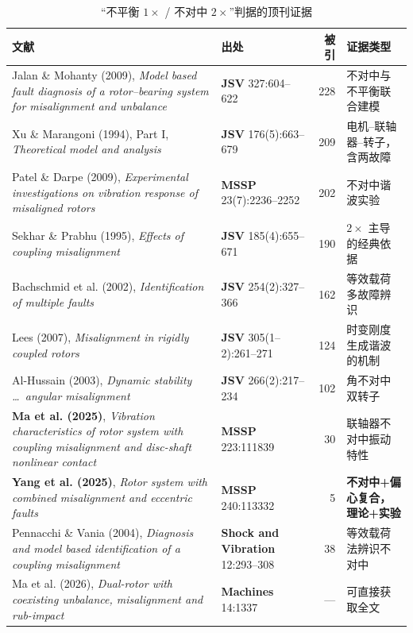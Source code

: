 \documentclass[11pt,a4paper]{ctexart}
\begin{document}
\begin{table}[h]
\centering
\caption{“不平衡 $1\times$ / 不对中 $2\times$”判据的顶刊证据}
\small
\begin{tabular}{@{}p{5.6cm}p{2.9cm}rp{3.2cm}@{}}
\toprule
文献 & 出处 & 被引 & 证据类型 \\
\midrule
Jalan \& Mohanty (2009), \emph{Model based fault diagnosis of a rotor--bearing system for misalignment and unbalance}
& \textbf{JSV} 327:604--622 & 228 & 不对中与不平衡联合建模 \\
Xu \& Marangoni (1994), Part I, \emph{Theoretical model and analysis}
& \textbf{JSV} 176(5):663--679 & 209 & 电机--联轴器--转子，含两故障 \\
Patel \& Darpe (2009), \emph{Experimental investigations on vibration response of misaligned rotors}
& \textbf{MSSP} 23(7):2236--2252 & 202 & 不对中谐波实验 \\
Sekhar \& Prabhu (1995), \emph{Effects of coupling misalignment}
& \textbf{JSV} 185(4):655--671 & 190 & $2\times$ 主导的经典依据 \\
Bachschmid et al. (2002), \emph{Identification of multiple faults}
& \textbf{JSV} 254(2):327--366 & 162 & 等效载荷多故障辨识 \\
Lees (2007), \emph{Misalignment in rigidly coupled rotors}
& \textbf{JSV} 305(1--2):261--271 & 124 & 时变刚度生成谐波的机制 \\
Al-Hussain (2003), \emph{Dynamic stability \dots\ angular misalignment}
& \textbf{JSV} 266(2):217--234 & 102 & 角不对中双转子 \\
\textbf{Ma et al. (2025)}, \emph{Vibration characteristics of rotor system with coupling misalignment and disc-shaft nonlinear contact}
& \textbf{MSSP} 223:111839 & 30 & 联轴器不对中振动特性 \\
\textbf{Yang et al. (2025)}, \emph{Rotor system with combined misalignment and eccentric faults}
& \textbf{MSSP} 240:113332 & 5 & \textbf{不对中+偏心复合，理论+实验} \\
\midrule
Pennacchi \& Vania (2004), \emph{Diagnosis and model based identification of a coupling misalignment}
& \textbf{Shock and Vibration} 12:293--308 & 38 & 等效载荷法辨识不对中 \\
Ma et al. (2026), \emph{Dual-rotor with coexisting unbalance, misalignment and rub-impact}
& \textbf{Machines} 14:1337 & --- & 可直接获取全文 \\
\bottomrule
\end{tabular}
\end{table}
\end{document}

